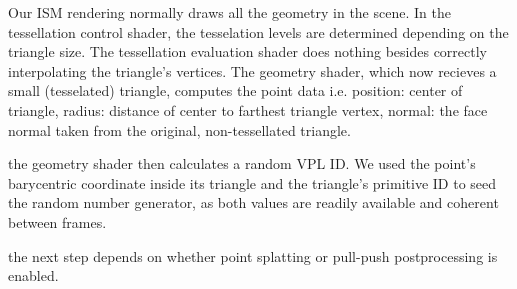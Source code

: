 \begin{outline}
\1 Our ISM rendering normally draws all the geometry in the scene.
\1 In the tessellation control shader, the tesselation levels are determined depending on the triangle size.
\1 The tessellation evaluation shader does nothing besides correctly interpolating the triangle's vertices.
\1 The geometry shader, which now recieves a small (tesselated) triangle, computes the point data
\1 i.e. position: center of triangle, radius: distance of center to farthest triangle vertex, normal: the face normal taken from the original, non-tessellated triangle.

\1 the geometry shader then calculates a random VPL ID. We used the point's barycentric coordinate inside its triangle and the triangle's primitive ID to seed the random number generator, as both values are readily available and coherent between frames.

\1 the next step depends on whether point splatting or pull-push postprocessing is enabled.
\end{outline}

